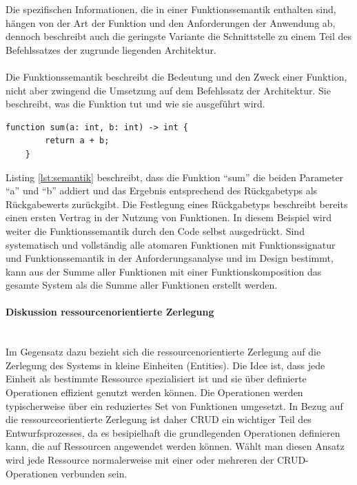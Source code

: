 \documentclass[../vs-script-first-v01.tex]{subfiles}
\begin{document}
Die spezifischen Informationen, die in einer Funktionssemantik enthalten sind, hängen von der Art der Funktion und den Anforderungen der Anwendung ab, dennoch beschreibt auch die geringste Variante die Schnittstelle zu einem Teil des Befehlssatzes der zugrunde liegenden Architektur. 
\\\\
Die Funktionssemantik beschreibt die Bedeutung und den Zweck einer Funktion, nicht aber zwingend die Umsetzung auf dem Befehlssatz der Architektur. Sie beschreibt, was die Funktion tut und wie sie ausgeführt wird. 
\begin{lstlisting}[caption={Funktionssemantik},captionpos=b,label={lst:semantik}]
    function sum(a: int, b: int) -> int {
        return a + b;
    }
\end{lstlisting}
Listing \ref{lst:semantik} beschreibt, dass die Funktion \enquote{sum} die beiden Parameter \enquote{a} und \enquote{b} addiert und das Ergebnis entsprechend des Rückgabetyps als Rückgabewerts zurückgibt. Die Festlegung eines Rückgabetyps beschreibt bereits einen ersten Vertrag in der Nutzung von Funktionen. In diesem Beispiel wird weiter die Funktionssemantik durch den Code selbst ausgedrückt. Sind systematisch und vollständig alle atomaren Funktionen mit Funktionssignatur und Funktionssemantik in der Anforderungsanalyse und im Design bestimmt, kann aus der Summe aller Funktionen mit einer Funktionskomposition das gesamte System als die Summe aller Funktionen erstellt werden. 

\paragraph{Diskussion ressourcenorientierte Zerlegung}\mbox{}\\
Im Gegensatz dazu bezieht sich die ressourcenorientierte Zerlegung auf die Zerlegung des Systems in kleine Einheiten (Entities). Die Idee ist, dass jede Einheit als bestimmte Ressource spezialisiert ist und sie über definierte Operationen effizient genutzt werden können. Die Operationen werden typischerweise über ein reduziertes Set von Funktionen umgesetzt.  In Bezug auf die ressourceorientierte Zerlegung ist daher CRUD ein wichtiger Teil des Entwurfsprozesses, da es besipielhaft die grundlegenden Operationen definieren kann, die auf Ressourcen angewendet werden können. Wählt man diesen Ansatz wird jede Ressource normalerweise mit einer oder mehreren der CRUD-Operationen verbunden sein.
\end{document}
